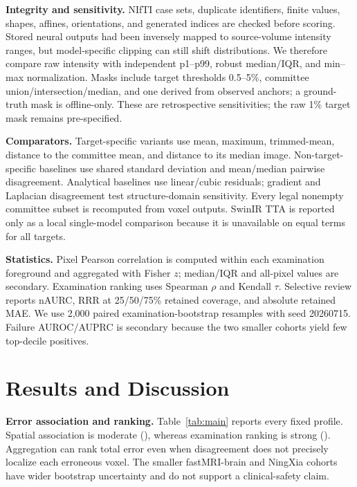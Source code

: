 \documentclass{article}
\begin{document}
\textbf{Integrity and sensitivity.} NIfTI case sets, duplicate identifiers, finite values, shapes, affines, orientations, and generated indices are checked before scoring. Stored neural outputs had been inversely mapped to source-volume intensity ranges, but model-specific clipping can still shift distributions. We therefore compare raw intensity with independent p1--p99, robust median/IQR, and min--max normalization. Masks include target thresholds 0.5--5\%, committee union/intersection/median, and one derived from observed anchors; a ground-truth mask is offline-only. These are retrospective sensitivities; the raw 1\% target mask remains pre-specified.

\textbf{Comparators.} Target-specific variants use mean, maximum, trimmed-mean, distance to the committee mean, and distance to its median image. Non-target-specific baselines use shared standard deviation and mean/median pairwise disagreement. Analytical baselines use linear/cubic residuals; gradient and Laplacian disagreement test structure-domain sensitivity. Every legal nonempty committee subset is recomputed from voxel outputs. SwinIR TTA is reported only as a local single-model comparison because it is unavailable on equal terms for all targets.

\textbf{Statistics.} Pixel Pearson correlation is computed within each examination foreground and aggregated with Fisher $z$; median/IQR and all-pixel values are secondary. Examination ranking uses Spearman $\rho$ and Kendall $\tau$. Selective review reports nAURC, RRR at 25/50/75\% retained coverage, and absolute retained MAE. We use 2,000 paired examination-bootstrap resamples with seed 20260715. Failure AUROC/AUPRC is secondary because the two smaller cohorts yield few top-decile positives.

\section{Results and Discussion}
\label{sec:results}

\begin{table}[t]
 \centering
 \caption{Pre-specified all-member median disagreement. Pixel $r_z$ is the inverse Fisher-$z$ mean of per-examination foreground correlations. Coverage is the retained fraction; lower nAURC is better. MAE$_{50}$ remains dataset-scale dependent.}
 \label{tab:main}
 \resizebox{\textwidth}{!}{}
\end{table}

\textbf{Error association and ranking.} Table~\ref{tab:main} reports every fixed profile. Spatial association is moderate (\PixelFisherRange), whereas examination ranking is strong (\CaseSpearmanRange). Aggregation can rank total error even when disagreement does not precisely localize each erroneous voxel. The smaller fastMRI-brain and NingXia cohorts have wider bootstrap uncertainty and do not support a clinical-safety claim.
\end{document}
